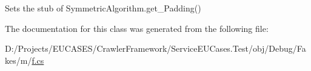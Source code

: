 Sets the stub of Symmetric\-Algorithm.\-get\-\_\-\-Padding()



The documentation for this class was generated from the following file\-:\begin{DoxyCompactItemize}
\item 
D\-:/\-Projects/\-E\-U\-C\-A\-S\-E\-S/\-Crawler\-Framework/\-Service\-E\-U\-Cases.\-Test/obj/\-Debug/\-Fakes/m/\hyperlink{m_2f_8cs}{f.\-cs}\end{DoxyCompactItemize}
